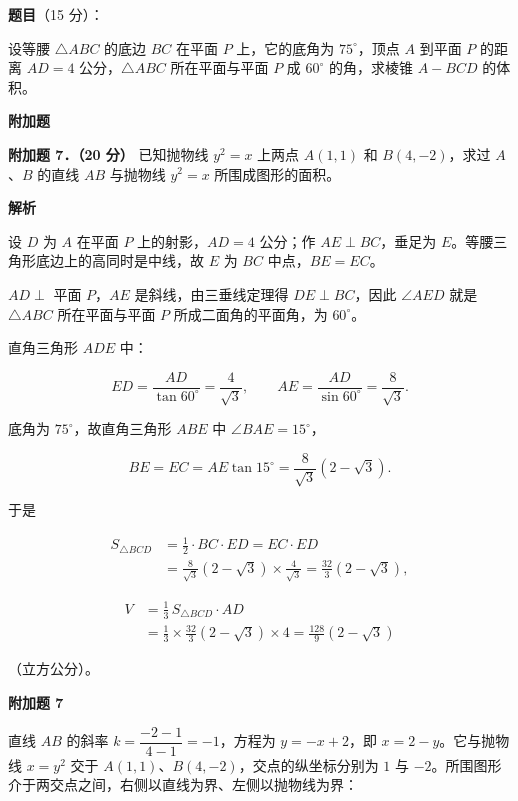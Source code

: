 \begin{answer}

\textbf{题目}（15 分）：

设等腰 $\triangle ABC$ 的底边 $BC$ 在平面 $P$ 上，它的底角为 $75^\circ$，顶点 $A$ 到平面 $P$ 的距离 $AD=4$ 公分，$\triangle ABC$ 所在平面与平面 $P$ 成 $60^\circ$ 的角，求棱锥 $A-BCD$ 的体积。

\begin{gktip}
\Needspace{0.25\textheight}
\textbf{附加题}
\end{gktip}

\textbf{附加题 7．（20 分）} 已知抛物线 $y^2=x$ 上两点 $A(1,1)$ 和 $B(4,-2)$，求过 $A$、$B$ 的直线 $AB$ 与抛物线 $y^2=x$ 所围成图形的面积。

\textbf{解析}

设 $D$ 为 $A$ 在平面 $P$ 上的射影，$AD=4$ 公分；作 $AE\perp BC$，垂足为 $E$。等腰三角形底边上的高同时是中线，故 $E$ 为 $BC$ 中点，$BE=EC$。

$AD\perp$ 平面 $P$，$AE$ 是斜线，由三垂线定理得 $DE\perp BC$，因此 $\angle AED$ 就是 $\triangle ABC$ 所在平面与平面 $P$ 所成二面角的平面角，为 $60^\circ$。

直角三角形 $ADE$ 中：

\nopagebreak[4]
\[
ED=\frac{AD}{\tan 60^\circ}=\frac{4}{\sqrt3},
\qquad
AE=\frac{AD}{\sin 60^\circ}=\frac{8}{\sqrt3}.
\]

底角为 $75^\circ$，故直角三角形 $ABE$ 中 $\angle BAE=15^\circ$，

\nopagebreak[4]
\[
BE=EC=AE\tan 15^\circ=\frac{8}{\sqrt3}(2-\sqrt3).
\]

于是

\nopagebreak[4]
\[
\begin{aligned}
S_{\triangle BCD}
&=\frac12\cdot BC\cdot ED=EC\cdot ED\\
&=\frac{8}{\sqrt3}(2-\sqrt3)\times\frac{4}{\sqrt3}
=\frac{32}{3}(2-\sqrt3),
\end{aligned}
\]

\nopagebreak[4]
\[
\begin{aligned}
V&=\frac13\,S_{\triangle BCD}\cdot AD\\
&=\frac13\times\frac{32}{3}(2-\sqrt3)\times4
=\frac{128}{9}(2-\sqrt3)
\end{aligned}
\]

（立方公分）。

\textbf{附加题 7}

直线 $AB$ 的斜率 $k=\dfrac{-2-1}{4-1}=-1$，方程为 $y=-x+2$，即 $x=2-y$。它与抛物线 $x=y^2$ 交于 $A(1,1)$、$B(4,-2)$，交点的纵坐标分别为 $1$ 与 $-2$。所围图形介于两交点之间，右侧以直线为界、左侧以抛物线为界：


\end{answer}
